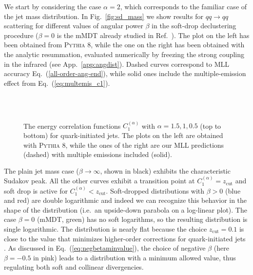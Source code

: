 \documentclass[letterpaper,11pt]{article}
\newcommand{\C}[2]{C^{(#2)}_{#1}}
\newcommand{\zcut}{z_\text{cut}}
\newcommand{\ea}{{\C{1}{\alpha}}}
\DeclareRobustCommand{\App}[1]{App.~\ref{#1}}
\DeclareRobustCommand{\Fig}[1]{Fig.~\ref{#1}}
\DeclareRobustCommand{\Eq}[1]{Eq.~(\ref{#1})}
\DeclareRobustCommand{\Ref}[1]{Ref.~\cite{#1}}
\newcommand{\pythia}[1]{\textsc{Pythia\xspace #1}}
\begin{document}
We start by considering the case $\alpha=2$, which corresponds to the familiar case of the jet mass distribution. In \Fig{fig:sd_mass} we show results for $qq \to qq$ scattering for different values of angular power $\beta$ in the soft-drop declustering procedure ($\beta=0$ is the mMDT  already studied in \Ref{taggersRES}). The plot on the left has been obtained from \pythia{8}, while the one on the right has been obtained with the analytic resummation, evaluated numerically by freezing the strong coupling in the infrared (see \App{app:angdist}). Dashed curves correspond to MLL accuracy \Eq{all-order-ang-end}, while solid ones include the multiple-emission effect from \Eq{eq:multemis_c1}.

\begin{figure}[p]
\begin{center}
$\quad$
~\\
$\quad$
~\\
$\quad$
\end{center}
\caption{
The energy correlation functions $\ea$ with $\alpha=1.5,1,0.5$ (top to bottom) for quark-initiated jets.
The plots on the left are obtained with \pythia{8}, while the ones of the right are our MLL predictions (dashed) with multiple emissions included (solid).
}
\label{fig:sd_angsmore}
\end{figure}

The plain jet mass case ($\beta \to \infty$, shown in black) exhibits the characteristic Sudakov peak. All the other curves exhibit a transition point at $\ea=\zcut$ and soft drop is active for $\ea<\zcut$. Soft-dropped distributions with $\beta>0$ (blue and red) are double logarithmic and indeed we can recognize this behavior in the shape of the distribution (i.e.~an upside-down parabola on a log-linear plot).  The case $\beta=0$ (mMDT, green) has no soft logarithms, so the resulting distribution is single logarithmic.  The distribution is nearly flat because the choice $\zcut=0.1$ is close to the value that minimizes higher-order corrections for quark-initiated jets \cite{taggersRES}.  As discussed in \Eq{eq:negbetaminvalue}, the choice of negative $\beta$ (here $\beta=-0.5$ in pink) leads to a distribution with a minimum allowed value, thus regulating both soft and collinear divergencies.
\end{document}
